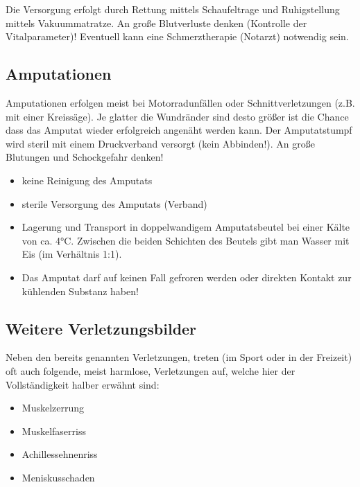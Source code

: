 Die Versorgung erfolgt durch Rettung mittels Schaufeltrage und Ruhigstellung
mittels Vakuummatratze. An große Blutverluste denken (Kontrolle der
Vitalparameter)! Eventuell kann eine Schmerztherapie (Notarzt) notwendig sein.

\subsection{Amputationen}


Amputationen erfolgen meist bei Motorradunfällen oder Schnittverletzungen (z.B.
mit einer Kreissäge). Je glatter die Wundränder sind desto größer ist die Chance
dass das Amputat wieder erfolgreich angenäht werden kann. Der Amputatstumpf wird
steril mit einem Druckverband versorgt (kein Abbinden!). An große Blutungen und
Schockgefahr denken!

{
\begin{itemize}
  \item keine Reinigung des Amputats
  \item sterile Versorgung des Amputats (Verband)
  \item Lagerung und Transport in doppelwandigem Amputatsbeutel bei  einer
  Kälte von ca. 4°C. Zwischen die beiden Schichten des Beutels gibt  man Wasser
  mit Eis (im Verhältnis 1:1).
  \item Das Amputat darf auf keinen Fall gefroren werden oder  direkten Kontakt
  zur kühlenden Substanz haben!
\end{itemize}
}

\subsection{Weitere Verletzungsbilder}

Neben den bereits genannten Verletzungen, treten (im Sport oder in der Freizeit)
oft auch folgende, meist harmlose, Verletzungen auf, welche hier der
Vollständigkeit halber erwähnt sind:

\begin{itemize}
     \item Muskelzerrung
     \item Muskelfaserriss
     \item Achillessehnenriss
     \item Meniskusschaden
\end{itemize}

